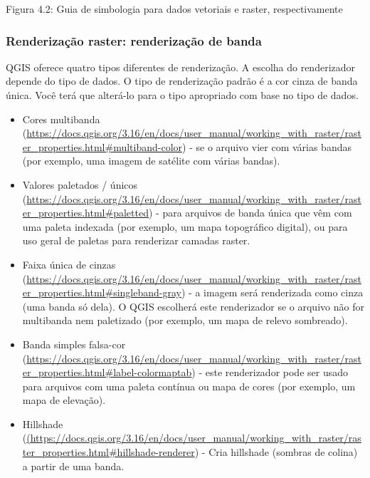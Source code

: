 \documentclass[
]{book}
\providecommand{\tightlist}{%
  \setlength{\itemsep}{0pt}\setlength{\parskip}{0pt}}
\begin{document}
Figura 4.2: Guia de simbologia para dados vetoriais e raster, respectivamente

\hypertarget{renderizauxe7uxe3o-raster-renderizauxe7uxe3o-de-banda}{%
\subsubsection{\texorpdfstring{\textbf{Renderização raster: renderização de banda}}{Renderização raster: renderização de banda}}\label{renderizauxe7uxe3o-raster-renderizauxe7uxe3o-de-banda}}

QGIS oferece quatro tipos diferentes de renderização. A escolha do renderizador depende do tipo de dados. O tipo de renderização padrão é a cor cinza de banda única. Você terá que alterá-lo para o tipo apropriado com base no tipo de dados.

\begin{itemize}
\tightlist
\item
  Cores multibanda (\url{https://docs.qgis.org/3.16/en/docs/user_manual/working_with_raster/raster_properties.html\#multiband-color}) - se o arquivo vier com várias bandas (por exemplo, uma imagem de satélite com várias bandas).
\item
  Valores paletados / únicos (\href{}{https://docs.qgis.org/3.16/en/docs/user\_manual/working\_with\_raster/raster\_properties.html\#paletted}) - para arquivos de banda única que vêm com uma paleta indexada (por exemplo, um mapa topográfico digital), ou para uso geral de paletas para renderizar camadas raster.
\item
  Faixa única de cinzas (\href{https://docs.qgis.org/3.16/en/docs/\%20user_manual\%20/\%20working_with_raster\%20/\%20raster_properties.html\%20\#\%20singleband-grey}{https://docs.qgis.org/3.16/en/docs/user\_manual/working\_with\_raster/raster\_properties.html\#singleband-gray}) - a imagem será renderizada como cinza (uma banda só dela). O QGIS escolherá este renderizador se o arquivo não for multibanda nem paletizado (por exemplo, um mapa de relevo sombreado).
\item
  Banda simples falsa-cor (\href{https://docs.qgis.org/3.16/en/docs/\%20user_manual\%20/\%20working_with_raster\%20/\%20raster_properties.html\%20\#\%20label-colormaptab}{https://docs.qgis.org/3.16/en/docs/user\_manual/working\_with\_raster/raster\_properties.html\#label-colormaptab}) - este renderizador pode ser usado para arquivos com uma paleta contínua ou mapa de cores (por exemplo, um mapa de elevação).
\item
  Hillshade (\href{https://docs.qgis.org/3.16/en/docs/\%20user_manual\%20/\%20working_with_raster\%20/\%20raster_properties.html\%20\#\%20hillshade-renderer}{(https://docs.qgis.org/3.16/en/docs/user\_manual/working\_with\_raster/raster\_properties.html\#hillshade-renderer}) - Cria hillshade (sombras de colina) a partir de uma banda.
\end{itemize}
\end{document}
